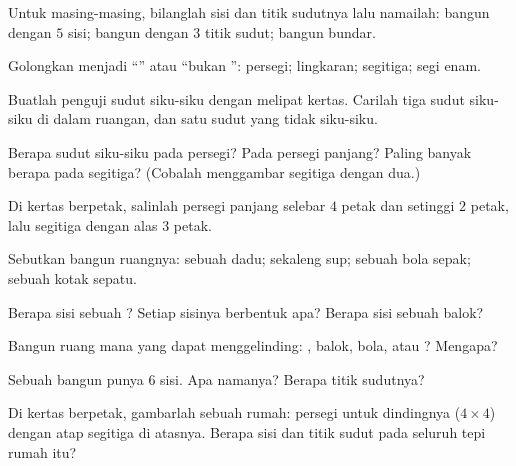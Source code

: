 \begin{exercise}[$\star$]\label{exo:g2:shapes:1}
Untuk masing-masing, bilanglah sisi dan titik sudutnya lalu namailah:
bangun dengan $5$ sisi; bangun dengan $3$ titik sudut; bangun bundar.
\end{exercise}

\begin{exercise}[$\star$]\label{exo:g2:shapes:2}
Golongkan menjadi ``'' atau ``bukan '':
persegi; lingkaran; segitiga; segi enam.
\end{exercise}

\begin{exercise}[$\star$]\label{exo:g2:shapes:3}
Buatlah penguji sudut siku-siku dengan melipat kertas. Carilah tiga
sudut siku-siku di dalam ruangan, dan satu sudut yang tidak siku-siku.
\end{exercise}

\begin{exercise}[$\star$]\label{exo:g2:shapes:4}
Berapa sudut siku-siku pada persegi? Pada persegi panjang? Paling
banyak berapa pada segitiga? (Cobalah menggambar segitiga dengan dua.)
\end{exercise}

\begin{exercise}[$\star$]\label{exo:g2:shapes:5}
Di kertas berpetak, salinlah persegi panjang selebar $4$ petak dan
setinggi $2$ petak, lalu segitiga dengan alas $3$ petak.
\end{exercise}

\begin{exercise}[$\star$]\label{exo:g2:shapes:6}
Sebutkan bangun ruangnya: sebuah dadu; sekaleng sup; sebuah bola sepak; sebuah kotak sepatu.
\end{exercise}

\begin{exercise}[$\star$]\label{exo:g2:shapes:7}
Berapa sisi sebuah ? Setiap sisinya berbentuk apa? Berapa sisi
sebuah balok?
\end{exercise}

\begin{exercise}[$\star$]\label{exo:g2:shapes:8}
Bangun ruang mana yang dapat menggelinding: , balok, bola, atau
? Mengapa?
\end{exercise}

\begin{exercise}[$\star$]\label{exo:g2:shapes:9}
Sebuah bangun punya $6$ sisi. Apa namanya? Berapa titik sudutnya?
\end{exercise}

\begin{exercise}[$\star\star$]\label{exo:g2:shapes:10}
Di kertas berpetak, gambarlah sebuah rumah: persegi untuk dindingnya
($4 \times 4$) dengan atap segitiga di atasnya. Berapa sisi dan titik
sudut pada seluruh tepi rumah itu?

\end{exercise}
